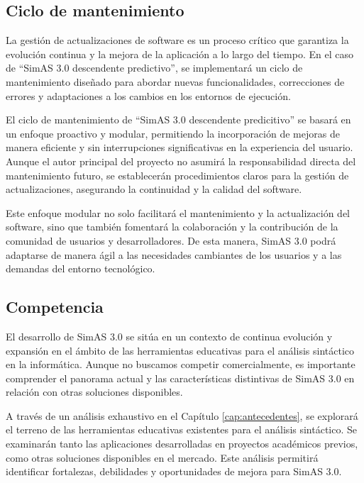 \subsection{Ciclo de mantenimiento} \label{subsec:actualizaciones}

La gestión de actualizaciones de software es un proceso crítico que garantiza la evolución continua y la mejora de la aplicación a lo largo del tiempo. En el caso de ``SimAS 3.0 descendente predictivo'', se implementará un ciclo de mantenimiento diseñado para abordar nuevas funcionalidades, correcciones de errores y adaptaciones a los cambios en los entornos de ejecución.

El ciclo de mantenimiento de ``SimAS 3.0 descendente predicitivo'' se basará en un enfoque proactivo y modular, permitiendo la incorporación de mejoras de manera eficiente y sin interrupciones significativas en la experiencia del usuario. Aunque el autor principal del proyecto no asumirá la responsabilidad directa del mantenimiento futuro, se establecerán procedimientos claros para la gestión de actualizaciones, asegurando la continuidad y la calidad del software.

Este enfoque modular no solo facilitará el mantenimiento y la actualización del software, sino que también fomentará la colaboración y la contribución de la comunidad de usuarios y desarrolladores. De esta manera, SimAS 3.0 podrá adaptarse de manera ágil a las necesidades cambiantes de los usuarios y a las demandas del entorno tecnológico.


\subsection{Competencia}

El desarrollo de SimAS 3.0 se sitúa en un contexto de continua evolución y expansión en el ámbito de las herramientas educativas para el análisis sintáctico en la informática. Aunque no buscamos competir comercialmente, es importante comprender el panorama actual y las características distintivas de SimAS 3.0 en relación con otras soluciones disponibles.

A través de un análisis exhaustivo en el Capítulo \ref{cap:antecedentes}, se explorará el terreno de las herramientas educativas existentes para el análisis sintáctico. Se examinarán tanto las aplicaciones desarrolladas en proyectos académicos previos, como otras soluciones disponibles en el mercado. Este análisis permitirá identificar fortalezas, debilidades y oportunidades de mejora para SimAS 3.0.

